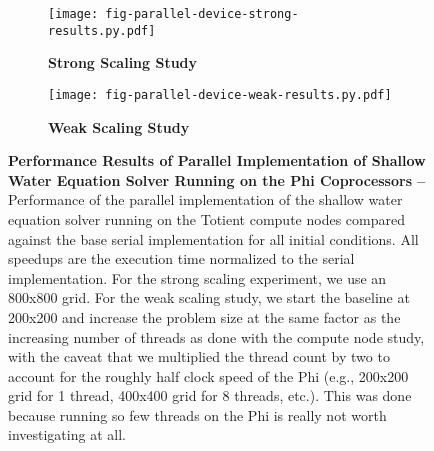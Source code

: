 
\begin{figure}[h]

  \begin{minipage}[t]{0.48\tw}
    \begin{subfigure}{\tw}

    \centering
    \texttt{[image: fig-parallel-device-strong-results.py.pdf]}
    \caption{\textbf{Strong Scaling Study}}
    \label{fig-parallel-device-strong-results}

    \end{subfigure}
  \end{minipage}%
  \hfill%
  \begin{minipage}[t]{0.48\tw}
  \begin{subfigure}{\tw}

  \centering
  \texttt{[image: fig-parallel-device-weak-results.py.pdf]}
  \caption{\textbf{Weak Scaling Study}}
  \label{fig-parallel-device-weak-results}

  \end{subfigure}
  \end{minipage}%

  \caption{\textbf{Performance Results of Parallel Implementation of
      Shallow Water Equation Solver Running on the Phi Coprocessors --}
    Performance of the parallel implementation of the shallow water
    equation solver running on the Totient compute nodes compared against
    the base serial implementation for all initial conditions. All
    speedups are the execution time normalized to the serial
    implementation. For the strong scaling experiment, we use an 800x800
    grid.  For the weak scaling study, we start the baseline at 200x200
    and increase the problem size at the same factor as the increasing number
    of threads as done with the compute node study, with the caveat that
    we multiplied the thread count by two to account for the roughly half
    clock speed of the Phi (e.g., 200x200 grid for 1 thread, 400x400 grid for
    8 threads, etc.). This was done because running so few threads on the Phi
    is really not worth investigating at all.}

  \label{fig-parallel-device-results}

\end{figure}

